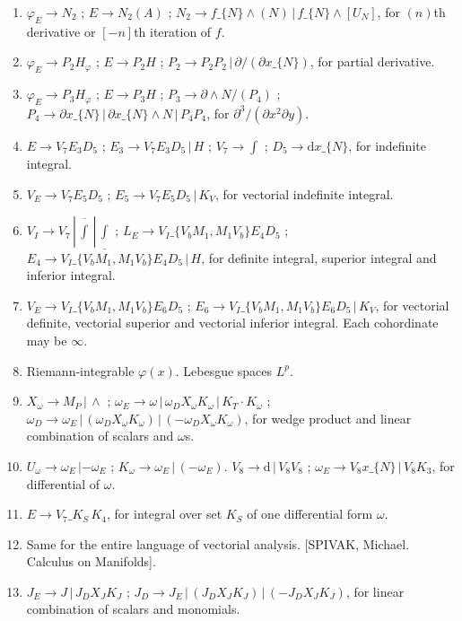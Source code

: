 \documentclass[11pt,a4paper]{article}
\newenvironment{myenum}
{ \begin{enumerate}
    \setlength{\itemsep}{0pt}
    \setlength{\parskip}{0pt}
    \setlength{\parsep}{0pt}     }
{ \end{enumerate}                  }
\begin{document}
\begin{myenum}
		\item $\varphi_E \rightarrow N_2$ ; $E \rightarrow N_2(A)$ ; $N_2 \rightarrow f\_\{N\}\wedge(N)\,|\,f\_\{N\}\wedge[U_N]$, for $(n)$th derivative or $[-n]$th iteration of $f$.
		\item $\varphi_E \rightarrow P_2 H_\varphi$ ; $E \rightarrow P_2 H$ ; $P_2 \rightarrow P_2P_2\,|\,\partial/(\partial x\_\{N\})$, for partial derivative.
		\item $\varphi_E \rightarrow P_3 H_\varphi$ ; $E \rightarrow P_3 H$ ; $P_3 \rightarrow \partial\wedge N/(P_4)$ ; $P_4 \rightarrow \partial x\_\{N\}\,|\,\partial x\_\{N\}\wedge N\,|\,P_4 P_4$, for $\partial^3/(\partial x^2 \partial y)$.
		\item $E \rightarrow V_7E_3D_5$ ; $E_3 \rightarrow V_7E_3D_5\,|\,H$ ; $V_7 \rightarrow \int$ ; $D_5 \rightarrow \mathrm{d}x\_\{N\}$, for indefinite integral.
		\item $V_E \rightarrow V_7E_5D_5$ ; $E_5 \rightarrow V_7E_5D_5\,|\,K_V$, for vectorial indefinite integral.
		\item $V_I \rightarrow V_7\,|\,\overline{\int}\,|\,\underline{\int}$ ; $L_E \rightarrow V_I\_\{V_bM_1,M_1V_b\} E_4 D_5$ ; $E_4 \rightarrow V_I\_\{V_bM_1,M_1V_b\}E_4D_5\,|\,H$, for definite integral, superior integral and inferior integral.
		\item $V_E \rightarrow V_I\_\{V_bM_1,M_1V_b\} E_6 D_5$ ; $E_6 \rightarrow V_I\_\{V_bM_1,M_1V_b\}E_6D_5\,|\,K_V$, for vectorial definite, vectorial superior and vectorial inferior integral. Each cohordinate may be $\infty$.
		\item Riemann-integrable $\varphi(x)$. Lebesgue spaces $L^p$.
		\item $X_\omega \rightarrow M_P\,|\,\wedge$ ; $\omega_E \rightarrow \omega\,|\,\omega_DX_\omega K_\omega \,|\,K_T\cdot K_\omega$ ; $\omega_D \rightarrow \omega_E\,|\,(\omega_DX_\omega K_\omega)\,|\,(-\omega_DX_\omega K_\omega)$, for wedge product and linear combination of scalars and $\omega$s.
		\item $U_\omega \rightarrow \omega_E\,| -\omega_E$ ; $K_\omega \rightarrow \omega_E\,|\,(-\omega_E)$. $V_8 \rightarrow \mathrm{d}\,|\,V_8V_8$ ; $\omega_E \rightarrow V_8x\_\{N\}\,|\,V_8K_3$, for differential of $\omega$.
		\item $E \rightarrow V_7\_K_S\,K_4$, for integral over set $K_S$ of one differential form $\omega$.
		\item Same for the entire language of vectorial analysis. [SPIVAK, Michael. Calculus on Manifolds].
		\item $J_E \rightarrow J\,|\,J_D X_J K_J$ ; $J_D \rightarrow J_E\,|\,(J_DX_J K_J)\,|\,(-J_DX_J K_J)$, for linear combination of scalars and monomials.

\end{myenum}
\end{document}
